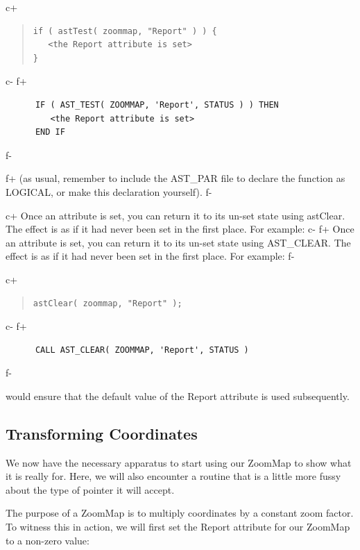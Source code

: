 \documentclass[twoside,11pt]{article}
\begin{document}
c+
\begin{quote}
\small
\begin{verbatim}
if ( astTest( zoommap, "Report" ) ) {
   <the Report attribute is set>
}
\end{verbatim}
\normalsize
\end{quote}
c-
f+
\small
\begin{verbatim}
      IF ( AST_TEST( ZOOMMAP, 'Report', STATUS ) ) THEN
         <the Report attribute is set>
      END IF
\end{verbatim}
\normalsize
f-

f+
(as usual, remember to include the AST\_PAR file to declare the
function as LOGICAL, or make this declaration yourself).
f-

c+
Once an attribute is set, you can return it to its un-set state using
astClear. The effect is as if it had never been set in the first
place. For example:
c-
f+
Once an attribute is set, you can return it to its un-set state using
AST\_CLEAR. The effect is as if it had never been set in the first
place. For example:
f-

c+
\begin{quote}
\small
\begin{verbatim}
astClear( zoommap, "Report" );
\end{verbatim}
\normalsize
\end{quote}
c-
f+
\small
\begin{verbatim}
      CALL AST_CLEAR( ZOOMMAP, 'Report', STATUS )
\end{verbatim}
\normalsize
f-

would ensure that the default value of the Report attribute is used
subsequently.


\subsection{\label{ss:transforming}Transforming Coordinates}

We now have the necessary apparatus to start using our ZoomMap to show
what it is really for. Here, we will also encounter a routine that is
a little more fussy about the type of pointer it will accept.

The purpose of a ZoomMap is to multiply coordinates by a constant zoom
factor. To witness this in action, we will first set the Report
attribute for our ZoomMap to a non-zero value:
\end{document}
